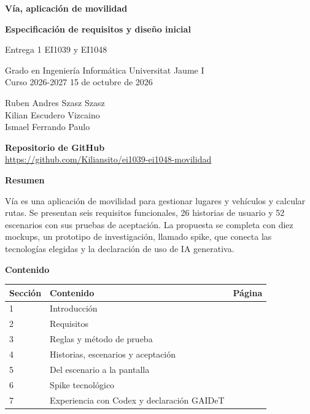 \documentclass[11pt,a4paper]{article}
\begin{document}
\fontsize{10.8}{14.7}\selectfont
\begin{center}
{\fontsize{25}{30}\selectfont\bfseries Vía, aplicación de movilidad\par}
\vspace{7pt}
{\fontsize{18}{23}\selectfont\bfseries Especificación de requisitos y diseño inicial\par}
\vspace{11pt}
{\fontsize{12}{16}\selectfont Entrega 1\textperiodcentered{} EI1039 y EI1048\par}
\vspace{14pt}
Grado en Ingeniería Informática\textperiodcentered{} Universitat Jaume I\\
Curso 2026-2027\textperiodcentered{} 15 de octubre de 2026
\vspace{12pt}

Ruben Andres Szasz Szasz\\
Kilian Escudero Vizcaino\\
Ismael Ferrando Paulo
\vspace{10pt}

\textbf{Repositorio de GitHub}\\[3pt]
\url{https://github.com/Kiliansito/ei1039-ei1048-movilidad}
\end{center}
\vspace{14pt}
\textbf{Resumen}\par
Vía es una aplicación de movilidad para gestionar lugares y vehículos y calcular rutas. Se presentan seis requisitos funcionales, 26 historias de usuario y 52 escenarios con sus pruebas de aceptación. La propuesta se completa con diez mockups, un prototipo de investigación, llamado spike, que conecta las tecnologías elegidas y la declaración de uso de IA generativa.

\vspace{10pt}
\textbf{Contenido}\par
\begin{tabularx}{\linewidth}{@{}p{1.25cm}Xr@{}}\toprule
\textbf{Sección}&\textbf{Contenido}&\textbf{Página}\\\midrule
1&Introducción&\pageref{sec1}\\[6pt]
2&Requisitos&\pageref{sec2}\\[6pt]
3&Reglas y método de prueba&\pageref{sec3}\\[6pt]
4&Historias, escenarios y aceptación&\pageref{sec4}\\[6pt]
5&Del escenario a la pantalla&\pageref{sec5}\\[6pt]
6&Spike tecnológico&\pageref{sec6}\\[6pt]
7&Experiencia con Codex y declaración GAIDeT&\pageref{sec7}\\\bottomrule
\end{tabularx}
\clearpage
\end{document}
